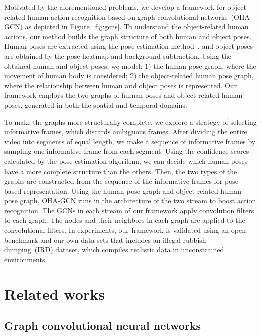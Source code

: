 \documentclass[10pt,twocolumn,letterpaper]{article}
\begin{document}
Motivated by the aforementioned problems, we develop a framework 
for object-related human action recognition based on graph convolutional networks~(OHA-GCN) as depicted in Figure~\ref{fig:gcns}.
To understand the object-related human actions, our method builds the graph structure of both human and object poses.
Human poses are extracted using the pose estimation method~\cite{cao2017realtime}, and object poses are obtained by the pose heatmap and background subtraction.
Using the obtained human and object poses, we model:
$1)$ the human pose graph, where the movement of human body is considered; 
$2)$ the object-related human pose graph, where the relationship between human and object poses is represented.
Our framework employs the two graphs of human poses and object-related human poses, generated in both the spatial and temporal domains.

To make the graphs more structurally complete, we explore a strategy of selecting informative frames, which discards ambiguous frames.  
After dividing the entire video into segments of equal length, we make a sequence of informative frames by sampling one informative frame from each segment.
Using the confidence scores calculated by the pose estimation algorithm, we can decide which human poses have a more complete structure than the others.
Then, the two types of the graphs are constructed from the sequence of the informative frames for pose-based representation.
Using the human pose graph and object-related human pose graph, OHA-GCN runs in the architecture of the two stream to boost action recognition.
The GCNs in each stream of our framework apply convolution filters to each graph.
The nodes and their neighbors in each graph are applied to the convolutional filters. 
In experiments, our framework is validated using an open benchmark and our own data sets that includes an illegal rubbish dumping~(IRD) dataset, which compiles realistic data in unconstrained environments.









\section{Related works}
\subsection{Graph convolutional neural networks}
\end{document}
